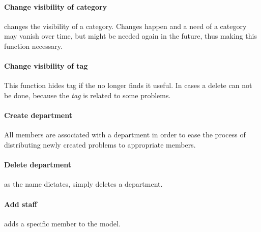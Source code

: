 \paragraph{Change visibility of category} changes the visibility of a category. Changes happen and a need of a category may vanish over time, but might be needed again in the future, thus making this function necessary. 

\paragraph{Change visibility of tag} This function hides tag if the \sadmin{} no longer finds it useful. In cases a delete can not be done, because the \textit{tag} is related to some problems. 




\paragraph{Create department} All \astaff[] members are associated with a department in order to ease the process of distributing newly created problems to appropriate \astaff[] members. 

\paragraph{Delete department} as the name dictates, simply deletes a department. 

\paragraph{Add staff} adds a specific \astaff[] member to the model. 

